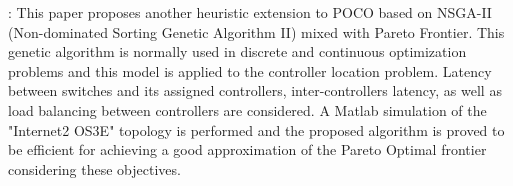 \documentclass[a4paper,10pt]{article}
\begin{document}



\cite{JaAh15}: This paper proposes another heuristic extension to POCO based on NSGA-II (Non-dominated Sorting Genetic Algorithm II)  mixed with Pareto Frontier. This genetic algorithm is normally used in discrete and continuous optimization problems and this model is applied to the controller location problem. Latency between switches and its assigned controllers, inter-controllers latency, as well as load balancing between controllers are considered. A Matlab simulation of the "Internet2 OS3E" topology is performed and the proposed algorithm is proved to be efficient for achieving a good approximation of the Pareto Optimal frontier considering these objectives. 
\end{document}
